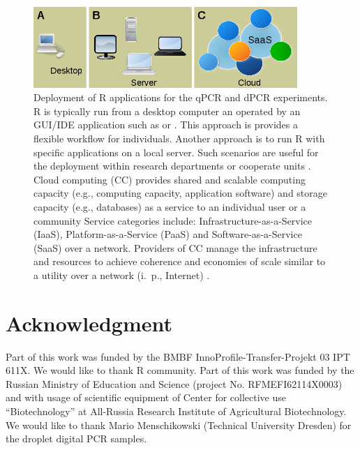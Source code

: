 \begin{figure}[htbp]
  \centering
  \includegraphics[clip=true, width=10cm]{figures/options.png}
  \caption{Deployment of R applications for the qPCR and dPCR experiments. 
 R is typically run from a desktop computer an operated by an 
GUI/IDE application such as  or . This approach is 
provides a flexible workflow for individuals.  Another approach is 
to run R with specific applications on a local server. Such scenarios are useful 
for the deployment within research departments or cooperate units \citep{R_web}. 
 Cloud computing (CC) provides shared and scalable computing 
capacity (e.g., computing capacity, application software) and storage capacity 
(e.g., databases) as a service to an individual user or a community Service 
categories include: Infrastructure-as-a-Service (IaaS), Platform-as-a-Service 
(PaaS) and Software-as-a-Service (SaaS) over a network. Providers of CC manage 
the infrastructure and resources to achieve coherence and economies of scale 
similar to a utility over a network (i.~p., Internet) \citep{R_cloud}.}
  \label{figure:options}
\end{figure} 

\section{Acknowledgment}

Part of this work was funded by the BMBF InnoProfile-Transfer-Projekt 03 IPT 
611X. We would like to thank R community. Part of this work was funded by the 
Russian Ministry of Education and Science (project No. RFMEFI62114X0003) and 
with usage of scientific equipment of Center for collective use 
``Biotechnology'' at All-Russia Research Institute of Agricultural 
Biotechnology. We would like to thank Mario Menschikowski (Technical University 
Dresden) for the droplet digital PCR samples.



\address{Stefan R\"odiger (corresponding author)\\
  Faculty of Natural Sciences\\
  Brandenburg University of Technology Cottbus--Senftenberg\\
  Senftenberg\\
  Germany}


